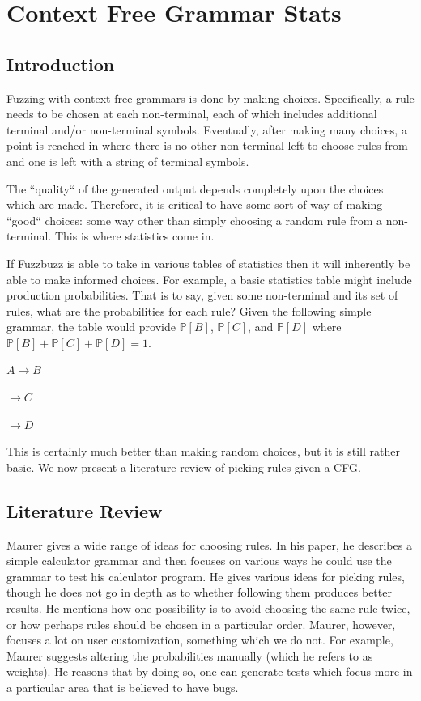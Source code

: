 \section{Context Free Grammar Stats}
\subsection{Introduction}
Fuzzing with context free grammars is done by making choices. Specifically, a
rule needs to be chosen at each non-terminal, each of which includes additional
terminal and/or non-terminal symbols. Eventually, after making many choices, a
point is reached in where there is no other non-terminal left to choose rules
from and one is left with a string of terminal symbols.

The ``quality`` of the generated output depends completely upon the choices
which are made. Therefore, it is critical to have some sort of way of making
``good`` choices: some way other than simply choosing a random rule from a
non-terminal. This is where statistics come in.

If Fuzzbuzz is able to take in various tables of statistics then it will
inherently be able to make informed choices. For example, a basic statistics
table might include production probabilities. That is to say, given some
non-terminal and its set of rules, what are the probabilities for each rule?
Given the following simple grammar, the table would provide $\mathbb{P}[B]$,
$\mathbb{P}[C]$, and $\mathbb{P}[D]$ where $\mathbb{P}[B] + \mathbb{P}[C] +
\mathbb{P}[D] = 1$.

\begin{center}
$A \rightarrow B$
\end{center}
\begin{center}
$\rightarrow C$
\end{center}
\begin{center}
$\rightarrow D$
\end{center}

This is certainly much better than making random choices, but it is still
rather basic. We now present a literature review of picking rules given a CFG.

\subsection{Literature Review}

Maurer\cite{Maurer1990} gives a wide range of ideas for choosing rules. In his
paper, he describes a simple calculator grammar and then focuses on various
ways he could use the grammar to test his calculator program. He gives various
ideas for picking rules, though he does not go in depth as to whether following
them produces better results. He mentions how one possibility is to avoid
choosing the same rule twice, or how perhaps rules should be chosen in a
particular order. Maurer, however, focuses a lot on user customization,
something which we do not. For example, Maurer suggests altering the
probabilities manually (which he refers to as weights). He reasons that by
doing so, one can generate tests which focus more in a particular area that is
believed to have bugs.

